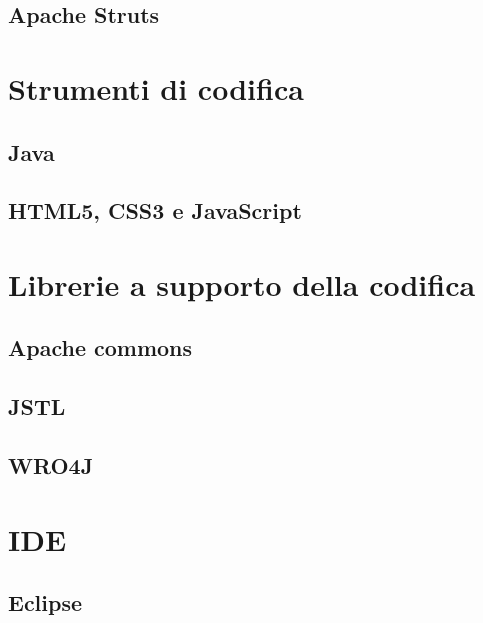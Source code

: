 \subsection{Apache Struts}


\section{Strumenti di codifica}
\subsection{Java}

\subsection{HTML5, CSS3 e JavaScript}


\section{Librerie a supporto della codifica}
\subsection{Apache commons}


\subsection{JSTL}


\subsection{WRO4J}


\section{IDE}
\subsection{Eclipse}
